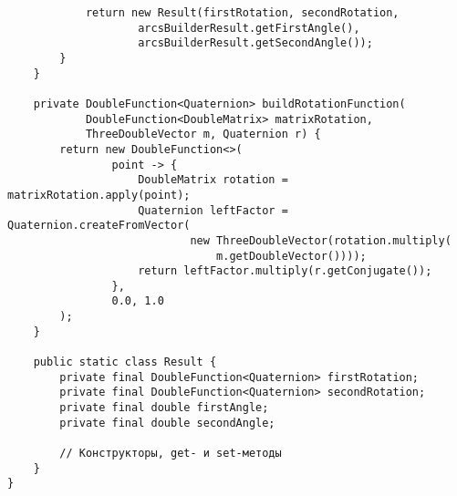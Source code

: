 \begin{verbatim}
            return new Result(firstRotation, secondRotation,
                    arcsBuilderResult.getFirstAngle(),
                    arcsBuilderResult.getSecondAngle());
        }
    }

    private DoubleFunction<Quaternion> buildRotationFunction(
            DoubleFunction<DoubleMatrix> matrixRotation,
            ThreeDoubleVector m, Quaternion r) {
        return new DoubleFunction<>(
                point -> {
                    DoubleMatrix rotation = matrixRotation.apply(point);
                    Quaternion leftFactor = Quaternion.createFromVector(
                            new ThreeDoubleVector(rotation.multiply(
                                m.getDoubleVector())));
                    return leftFactor.multiply(r.getConjugate());
                },
                0.0, 1.0
        );
    }

    public static class Result {
        private final DoubleFunction<Quaternion> firstRotation;
        private final DoubleFunction<Quaternion> secondRotation;
        private final double firstAngle;
        private final double secondAngle;

        // Конструкторы, get- и set-методы
    }
}
\end{verbatim}

